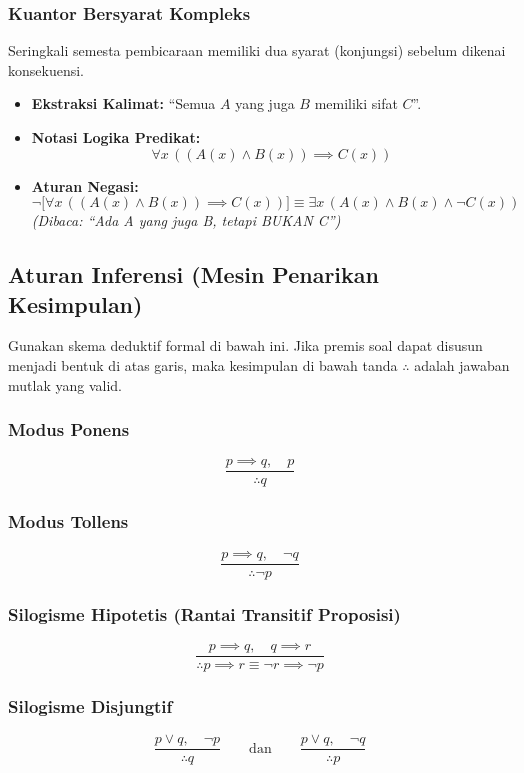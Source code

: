 \subsubsection{Kuantor Bersyarat Kompleks}
Seringkali semesta pembicaraan memiliki dua syarat (konjungsi) sebelum dikenai konsekuensi.
\begin{itemize}
\item \textbf{Ekstraksi Kalimat: } ``Semua $A$ yang juga $B$ memiliki sifat $C$''.
\item \textbf{Notasi Logika Predikat: } \[ \forall x \, ((A(x) \land B(x)) \implies C(x)) \]
\item \textbf{Aturan Negasi: } \[ \neg \big[ \forall x \, ((A(x) \land B(x)) \implies C(x)) \big] \equiv \exists x \, (A(x) \land B(x) \land \neg C(x)) \]
\textit{(Dibaca: ``Ada A yang juga B, tetapi BUKAN C'')}
\end{itemize}

\subsection{Aturan Inferensi (Mesin Penarikan Kesimpulan)}
Gunakan skema deduktif formal di bawah ini. Jika premis soal dapat disusun menjadi bentuk di atas garis, maka kesimpulan di bawah tanda $\therefore$ adalah jawaban mutlak yang valid.

\subsubsection{Modus Ponens}
\[ \frac{p \implies q, \quad p}{\therefore q}\]

\subsubsection{Modus Tollens}
\[ \frac{p \implies q, \quad \neg q}{\therefore \neg p}\]

\subsubsection{Silogisme Hipotetis (Rantai Transitif Proposisi)}
\[ \frac{p \implies q, \quad q \implies r}{\therefore p \implies r \equiv \neg r \implies \neg p}\]

\subsubsection{Silogisme Disjungtif}
\[ \frac{p \lor q, \quad \neg p}{\therefore q} \qquad \text{dan} \qquad \frac{p \lor q, \quad \neg q}{\therefore p} \]

